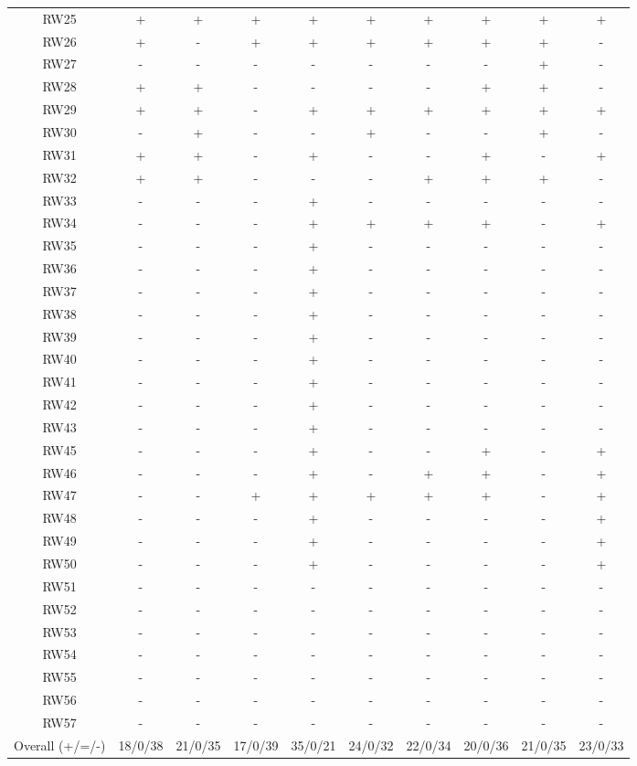 \begin{center}
\begin{longtable}{cccccccccc}
RW25 & + & + & + & + & + & + & + & + & + \\
RW26 & + & - & + & + & + & + & + & + & - \\
RW27 & - & - & - & - & - & - & - & + & - \\
RW28 & + & + & - & - & - & - & + & + & - \\
RW29 & + & + & - & + & + & + & + & + & + \\
RW30 & - & + & - & - & + & - & - & + & - \\
RW31 & + & + & - & + & - & - & + & - & + \\
RW32 & + & + & - & - & - & + & + & + & - \\
RW33 & - & - & - & + & - & - & - & - & - \\
RW34 & - & - & - & + & + & + & + & - & + \\
RW35 & - & - & - & + & - & - & - & - & - \\
RW36 & - & - & - & + & - & - & - & - & - \\
RW37 & - & - & - & + & - & - & - & - & - \\
RW38 & - & - & - & + & - & - & - & - & - \\
RW39 & - & - & - & + & - & - & - & - & - \\
RW40 & - & - & - & + & - & - & - & - & - \\
RW41 & - & - & - & + & - & - & - & - & - \\
RW42 & - & - & - & + & - & - & - & - & - \\
RW43 & - & - & - & + & - & - & - & - & - \\
RW45 & - & - & - & + & - & - & + & - & + \\
RW46 & - & - & - & + & - & + & + & - & + \\
RW47 & - & - & + & + & + & + & + & - & + \\
RW48 & - & - & - & + & - & - & - & - & + \\
RW49 & - & - & - & + & - & - & - & - & + \\
RW50 & - & - & - & + & - & - & - & - & + \\
RW51 & - & - & - & - & - & - & - & - & - \\
RW52 & - & - & - & - & - & - & - & - & - \\
RW53 & - & - & - & - & - & - & - & - & - \\
RW54 & - & - & - & - & - & - & - & - & - \\
RW55 & - & - & - & - & - & - & - & - & - \\
RW56 & - & - & - & - & - & - & - & - & - \\
RW57 & - & - & - & - & - & - & - & - & - \\
\midrule
Overall (+/=/-) & 18/0/38 & 21/0/35 & 17/0/39 & 35/0/21 & 24/0/32 & 22/0/34 & 20/0/36 & 21/0/35 & 23/0/33 \\
\bottomrule
\end{longtable}
\end{center}
